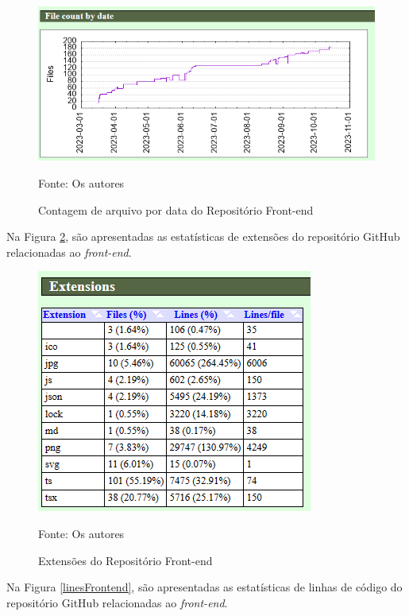 \begin{apendicesenv}
\begin{figure}[H]
	\centering
	\includegraphics[scale=0.8]{./imagens/metricas/gitStatsFrontend/files/fileCount.png}
	\caption{Contagem de arquivo por data do Repositório Front-end}
	Fonte: Os autores
    \label{fileCountFrontend}
\end{figure}

Na Figura \ref{extensionsFrontend}, são apresentadas as estatísticas de extensões do repositório GitHub relacionadas ao \textit{front-end}.

\begin{figure}[H]
	\centering
	\includegraphics[scale=1]{./imagens/metricas/gitStatsFrontend/files/extensions.png}
	\caption{Extensões do Repositório Front-end}
	Fonte: Os autores
    \label{extensionsFrontend}
\end{figure}
\pagebreak

Na Figura \ref{linesFrontend}, são apresentadas as estatísticas de linhas de código do repositório GitHub relacionadas ao \textit{front-end}.


\end{apendicesenv}
